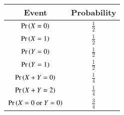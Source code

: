 
\begin{center}
\begin{tabular}{|c|c|}
\hline
\textbf{Event}& \textbf{Probability} \\ \hline
$\Pr\left(X = 0\right)$ &  $\frac{1}{2}$ \\ \hline
$\Pr\left(X = 1\right)$ &  $\frac{1}{2}$ \\ \hline
$\Pr\left(Y = 0\right)$ &  $\frac{1}{2}$ \\ \hline
$\Pr\left(Y = 1\right)$ &  $\frac{1}{2}$ \\ \hline
$\Pr\left(X + Y = 0\right)$ & 	$\frac{1}{4}$ \\ \hline
$\Pr\left(X + Y = 2\right)$ & 	$\frac{1}{4}$ \\ \hline
$\Pr\left(X = 0 \text{ or } Y = 0\right)$ & 	$\frac{3}{4}$ \\ \hline
\end{tabular}
\end{center}
